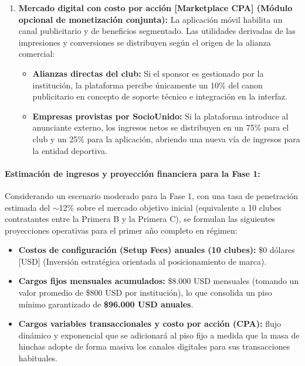 \begin{enumerate}
\begin{itemize}
    \end{itemize}
    \item \textbf{Mercado digital con costo por acción [Marketplace CPA] (Módulo opcional de monetización conjunta):} La aplicación móvil habilita un canal publicitario y de beneficios segmentado. Las utilidades derivadas de las impresiones y conversiones se distribuyen según el origen de la alianza comercial:
    \begin{itemize}
        \item \textbf{Alianzas directas del club:} Si el sponsor es gestionado por la institución, la plataforma percibe únicamente un 10\% del canon publicitario en concepto de soporte técnico e integración en la interfaz.
        \item \textbf{Empresas provistas por SocioUnido:} Si la plataforma introduce al anunciante externo, los ingresos netos se distribuyen en un 75\% para el club y un 25\% para la aplicación, abriendo una nueva vía de ingresos para la entidad deportiva.
    \end{itemize}
\end{enumerate}

\newpage

\paragraph{Estimación de ingresos y proyección financiera para la Fase 1:}

Considerando un escenario moderado para la Fase 1, con una tasa de penetración estimada del $\sim$12\% sobre el mercado objetivo inicial (equivalente a 10 clubes contratantes entre la Primera B y la Primera C), se formulan las siguientes proyecciones operativas para el primer año completo en régimen:
\begin{itemize}
    \item \textbf{Costos de configuración (Setup Fees) anuales (10 clubes):} \$0 dólares [USD] (Inversión estratégica orientada al posicionamiento de marca).
    \item \textbf{Cargos fijos mensuales acumulados:} \$8.000 USD mensuales (tomando un valor promedio de \$800 USD por institución), lo que consolida un piso mínimo garantizado de \textbf{\$96.000 USD anuales}.
    \item \textbf{Cargos variables transaccionales y costo por acción (CPA):} flujo dinámico y exponencial que se adicionará al piso fijo a medida que la masa de hinchas adopte de forma masiva los canales digitales para sus transacciones habituales.
\end{itemize}

